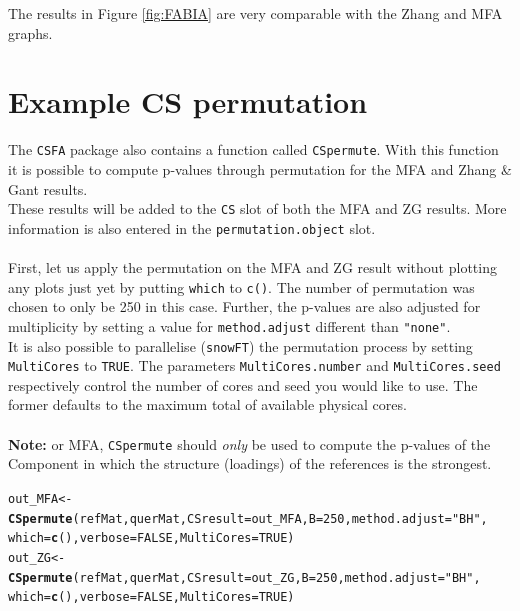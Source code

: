 \documentclass[a4paper]{article}\usepackage[]{graphicx}\usepackage[]{color}
\makeatletter
\newcommand{\hlnum}[1]{\textcolor[rgb]{0.686,0.059,0.569}{#1}}%
\newcommand{\hlstr}[1]{\textcolor[rgb]{0.192,0.494,0.8}{#1}}%
\newcommand{\hlstd}[1]{\textcolor[rgb]{0.345,0.345,0.345}{#1}}%
\newcommand{\hlkwb}[1]{\textcolor[rgb]{0.69,0.353,0.396}{#1}}%
\newcommand{\hlkwc}[1]{\textcolor[rgb]{0.333,0.667,0.333}{#1}}%
\newcommand{\hlkwd}[1]{\textcolor[rgb]{0.737,0.353,0.396}{\textbf{#1}}}%
\newenvironment{kframe}{%
 \def\at@end@of@kframe{}%
 \ifinner\ifhmode%
  \def\at@end@of@kframe{\end{minipage}}%
  \begin{minipage}{\columnwidth}%
 \fi\fi%
 \def\FrameCommand##1{\hskip\@totalleftmargin \hskip-\fboxsep
 \colorbox{shadecolor}{##1}\hskip-\fboxsep
     \hskip-\linewidth \hskip-\@totalleftmargin \hskip\columnwidth}%
 \MakeFramed {\advance\hsize-\width
   \@totalleftmargin\z@ \linewidth\hsize
   \@setminipage}}%
 {\par\unskip\endMakeFramed%
 \at@end@of@kframe}
\newenvironment{knitrout}{}{} %
\makeatother
\begin{document}
\noindent The results in Figure \ref{fig:FABIA} are very comparable with the
Zhang and MFA graphs.

\section{Example CS permutation}
The \texttt{CSFA} package also contains a function called \texttt{CSpermute}.
With this function it is possible to compute p-values through permutation for
the MFA and Zhang \& Gant results. \\
These results will be added to the \verb|CS| slot of both the MFA and ZG
results. More information is also entered in the \verb|permutation.object| slot. 
\\ \\
First, let us apply the permutation on the MFA and ZG result without plotting
any plots just yet by putting \texttt{which} to \texttt{c()}. The number of
permutation was chosen to only be 250 in this case. Further, the p-values are
also adjusted for multiplicity by setting a value for \texttt{method.adjust}
different than \texttt{"none"}.\\
It is also possible to parallelise (\texttt{snowFT}) the permutation process  by setting \texttt{MultiCores} to \texttt{TRUE}. The parameters \texttt{MultiCores.number} and \texttt{MultiCores.seed} respectively control the number of cores and seed you would like to use. The former defaults to the maximum total of available physical cores.
\\ \\
{\bf Note:} or MFA, \texttt{CSpermute} should {\it only} be used to compute the
p-values of the Component in which the structure (loadings) of the references is the strongest.



\begin{knitrout}
\color{fgcolor}\begin{kframe}
\begin{alltt}
        \hlstd{out_MFA} \hlkwb{<-} \hlkwd{CSpermute}\hlstd{(refMat,querMat,}\hlkwc{CSresult}\hlstd{=out_MFA,}\hlkwc{B}\hlstd{=}\hlnum{250}\hlstd{,}\hlkwc{method.adjust}\hlstd{=}\hlstr{"BH"}\hlstd{,}
                        \hlkwc{which}\hlstd{=}\hlkwd{c}\hlstd{(),}\hlkwc{verbose}\hlstd{=}\hlnum{FALSE}\hlstd{,}\hlkwc{MultiCores}\hlstd{=}\hlnum{TRUE}\hlstd{)}
        \hlstd{out_ZG} \hlkwb{<-} \hlkwd{CSpermute}\hlstd{(refMat,querMat,}\hlkwc{CSresult}\hlstd{=out_ZG,}\hlkwc{B}\hlstd{=}\hlnum{250}\hlstd{,}\hlkwc{method.adjust}\hlstd{=}\hlstr{"BH"}\hlstd{,}
                        \hlkwc{which}\hlstd{=}\hlkwd{c}\hlstd{(),}\hlkwc{verbose}\hlstd{=}\hlnum{FALSE}\hlstd{,}\hlkwc{MultiCores}\hlstd{=}\hlnum{TRUE}\hlstd{)}
\end{alltt}
\end{kframe}
\end{knitrout}
\end{document}
